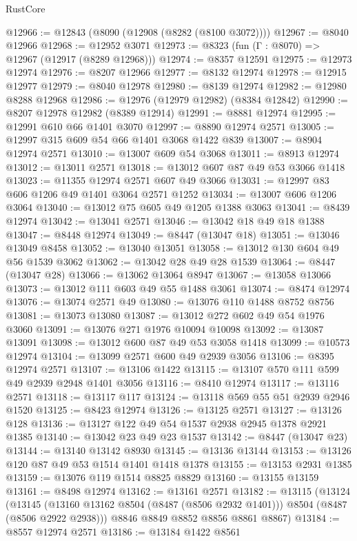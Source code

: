 \begin{lexlean}{RustCore}
\begin{coremodule}
@12966 := @12843 (@8090 (@12908 (@8282 (@8100 @3072))))
@12967 := @8040 @12966
@12968 := @12952 @3071
@12973 := @8323 (fun (Γ : @8070) => @12967 (@12917 (@8289 @12968)))
@12974 := @8357 @12591
@12975 := @12973 @12974
@12976 := @8207 @12966
@12977 := @8132 @12974
@12978 := @12915 @12977
@12979 := @8040 @12978
@12980 := @8139 @12974
@12982 := @12980 @8288 @12968
@12986 := @12976 (@12979 @12982) (@8384 @12842)
@12990 := @8207 @12978 @12982 (@8389 @12914)
@12991 := @8881 @12974
@12995 := @12991 @610 @66 @1401 @3070
@12997 := @8890 @12974 @2571
@13005 := @12997 @315 @609 @54 @66 @1401 @3068 @1422 @839
@13007 := @8904 @12974 @2571
@13010 := @13007 @609 @54 @3068
@13011 := @8913 @12974
@13012 := @13011 @2571
@13018 := @13012 @607 @87 @49 @53 @3066 @1418
@13023 := @11355 @12974 @2571 @607 @49 @3066
@13031 := @12997 @83 @606 @1206 @49 @1401 @3064 @2571 @1252
@13034 := @13007 @606 @1206 @3064
@13040 := @13012 @75 @605 @49 @1205 @1388 @3063
@13041 := @8439 @12974
@13042 := @13041 @2571
@13046 := @13042 @18 @49 @18 @1388
@13047 := @8448 @12974
@13049 := @8447 (@13047 @18)
@13051 := @13046 @13049 @8458
@13052 := @13040 @13051
@13058 := @13012 @130 @604 @49 @56 @1539 @3062
@13062 := @13042 @28 @49 @28 @1539
@13064 := @8447 (@13047 @28)
@13066 := @13062 @13064 @8947
@13067 := @13058 @13066
@13073 := @13012 @111 @603 @49 @55 @1488 @3061
@13074 := @8474 @12974
@13076 := @13074 @2571 @49
@13080 := @13076 @110 @1488 @8752 @8756
@13081 := @13073 @13080
@13087 := @13012 @272 @602 @49 @54 @1976 @3060
@13091 := @13076 @271 @1976 @10094 @10098
@13092 := @13087 @13091
@13098 := @13012 @600 @87 @49 @53 @3058 @1418
@13099 := @10573 @12974
@13104 := @13099 @2571 @600 @49 @2939 @3056
@13106 := @8395 @12974 @2571
@13107 := @13106 @1422
@13115 := @13107 @570 @111 @599 @49 @2939 @2948 @1401 @3056
@13116 := @8410 @12974
@13117 := @13116 @2571
@13118 := @13117 @117
@13124 := @13118 @569 @55 @51 @2939 @2946 @1520
@13125 := @8423 @12974
@13126 := @13125 @2571
@13127 := @13126 @128
@13136 := @13127 @122 @49 @54 @1537 @2938 @2945 @1378 @2921 @1385
@13140 := @13042 @23 @49 @23 @1537
@13142 := @8447 (@13047 @23)
@13144 := @13140 @13142 @8930
@13145 := @13136 @13144
@13153 := @13126 @120 @87 @49 @53 @1514 @1401 @1418 @1378
@13155 := @13153 @2931 @1385
@13159 := @13076 @119 @1514 @8825 @8829
@13160 := @13155 @13159
@13161 := @8498 @12974
@13162 := @13161 @2571
@13182 := @13115
    (@13124
      (@13145 (@13160 @13162 @8504 (@8487 (@8506 @2932 @1401))) @8504 (@8487 (@8506 @2922 @2938)))
      @8846
      @8849
      @8852
      @8856
      @8861
      @8867)
@13184 := @8557 @12974 @2571
@13186 := @13184 @1422 @8561

\end{coremodule}
\end{lexlean}
